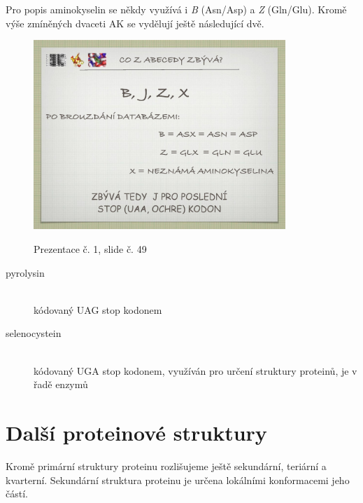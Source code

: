 \documentclass[DIV=8]{scrreprt}
\begin{document}
Pro popis aminokyselin se někdy využívá i \emph{B} (Asn/Asp) a \emph{Z} (Gln/Glu). Kromě výše zmíněných dvaceti AK se vydělují ještě následující dvě.

\begin{figure}
    \caption{Prezentace č. 1, slide č. 49}
    \includegraphics[width=0.85\textwidth]{slides-1/slide-49.jpg}
    \centering
    \label{slides-1-slide-49}
\end{figure}

\begin{description}
\item[pyrolysin]\hfill \\
kódovaný UAG stop kodonem


\item[selenocystein]\hfill \\
kódovaný UGA stop kodonem, využíván pro určení struktury proteinů, je v řadě enzymů

\end{description}


\section{Další proteinové struktury} \label{Další proteinové struktury} \FloatBarrier


Kromě primární struktury proteinu rozlišujeme ještě sekundární, teriární a kvarterní. Sekundární struktura proteinu je určena lokálními konformacemi jeho částí.
\end{document}
